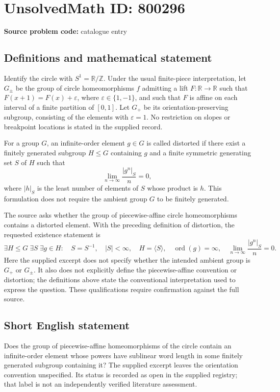 \documentclass[11pt]{article}
\newcommand{\Z}{\mathbb{Z}}
\newcommand{\R}{\mathbb{R}}
\begin{document}
\section*{UnsolvedMath ID: 800296}
\textbf{Source problem code:} catalogue entry
\subsection{Definitions and mathematical statement}
Identify the circle with \(S^1=\R/\Z\). Under the usual finite-piece interpretation, let \(G_{\pm}\) be the group of circle homeomorphisms \(f\) admitting a lift \(F\colon\R\to\R\) such that \(F(x+1)=F(x)+\varepsilon\), where \(\varepsilon\in\{1,-1\}\), and such that \(F\) is affine on each interval of a finite partition of \([0,1]\). Let \(G_+\) be its orientation-preserving subgroup, consisting of the elements with \(\varepsilon=1\). No restriction on slopes or breakpoint locations is stated in the supplied record.

For a group \(G\), an infinite-order element \(g\in G\) is called distorted if there exist a finitely generated subgroup \(H\leq G\) containing \(g\) and a finite symmetric generating set \(S\) of \(H\) such that
\[
\lim_{n\to\infty}\frac{|g^n|_S}{n}=0,
\]
where \(|h|_S\) is the least number of elements of \(S\) whose product is \(h\). This formulation does not require the ambient group \(G\) to be finitely generated.

The source asks whether the group of piecewise-affine circle homeomorphisms contains a distorted element. With the preceding definition of distortion, the requested existence statement is
\[
\exists H\leq G\;\exists S\;\exists g\in H:\quad
S=S^{-1},\quad |S|<\infty,\quad H=\langle S\rangle,\quad
\operatorname{ord}(g)=\infty,\quad
\lim_{n\to\infty}\frac{|g^n|_S}{n}=0.
\]
Here the supplied excerpt does not specify whether the intended ambient group is \(G_+\) or \(G_{\pm}\). It also does not explicitly define the piecewise-affine convention or distortion; the definitions above state the conventional interpretation used to express the question. These qualifications require confirmation against the full source.
\subsection{Short English statement}
Does the group of piecewise-affine homeomorphisms of the circle contain an infinite-order element whose powers have sublinear word length in some finitely generated subgroup containing it? The supplied excerpt leaves the orientation convention unspecified. Its status is recorded as open in the supplied registry; that label is not an independently verified literature assessment.
\end{document}
